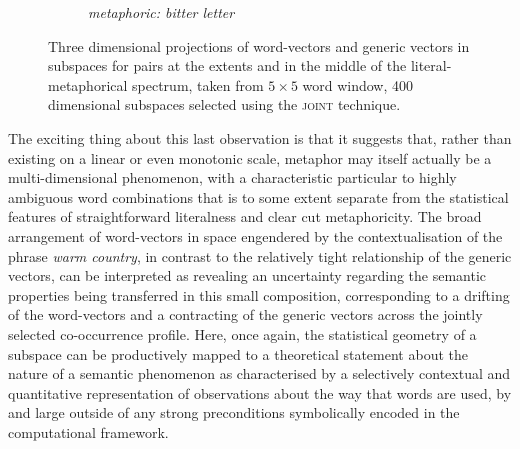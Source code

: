 \begin{figure}
\begin{subfigure}{0.3\textwidth}
\caption*{\footnotesize \emph{metaphoric: bitter letter}}
\end{subfigure}
\caption[Metaphors In Space]{Three dimensional projections of word-vectors and generic vectors in subspaces for pairs at the extents and in the middle of the literal-metaphorical spectrum, taken from $5 \times 5$ word window, 400 dimensional subspaces selected using the \textsc{joint} technique.}
\label{fig:metaspaces}
\end{figure}

The exciting thing about this last observation is that it suggests that, rather than existing on a linear or even monotonic scale, metaphor may itself actually be a multi-dimensional phenomenon, with a characteristic particular to highly ambiguous word combinations that is to some extent separate from the statistical features of straightforward literalness and clear cut metaphoricity.  The broad arrangement of word-vectors in space engendered by the contextualisation of the phrase \emph{warm country}, in contrast to the relatively tight relationship of the generic vectors, can be interpreted as revealing an uncertainty regarding the semantic properties being transferred in this small composition, corresponding to a drifting of the word-vectors and a contracting of the generic vectors across the jointly selected co-occurrence profile.  Here, once again, the statistical geometry of a subspace can be productively mapped to a theoretical statement about the nature of a semantic phenomenon as characterised by a selectively contextual and quantitative representation of observations about the way that words are used, by and large outside of any strong preconditions symbolically encoded in the computational framework.

